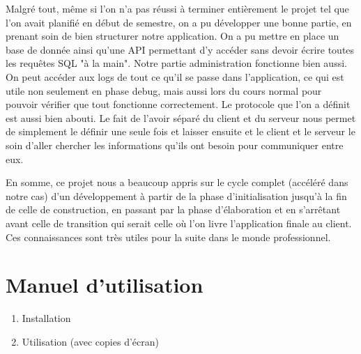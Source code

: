 \documentclass[a4paper,12pt]{article}
\begin{document}
	Malgré tout, même si l'on n'a pas réussi à terminer entièrement le projet tel que l'on avait planifié en début de semestre, on a pu développer une bonne partie, en prenant soin de bien structurer notre application. On a pu mettre en place un base de donnée ainsi qu'une API permettant d'y accéder sans devoir écrire toutes les requêtes SQL "à la main". Notre partie administration fonctionne bien aussi. On peut accéder aux logs de tout ce qu'il se passe dans l'application, ce qui est utile non seulement en phase debug, mais aussi lors du cours normal pour pouvoir vérifier que tout fonctionne correctement. Le protocole que l'on a définit est aussi bien abouti. Le fait de l'avoir séparé du client et du serveur nous permet de simplement le définir une seule fois et laisser ensuite et le client et le serveur le soin d'aller chercher les informations qu'ils ont besoin pour communiquer entre eux.
	
	En somme, ce projet nous a beaucoup appris sur le cycle complet (accéléré dans notre cas) d'un développement à partir de la phase d'initialisation jusqu'à la fin de celle de construction, en passant par la phase d'élaboration et en s'arrêtant avant celle de transition qui serait celle où l'on livre l'application finale au client. Ces connaissances sont très utiles pour la suite dans le monde professionnel.
	
	\appendix
	\section{Manuel d'utilisation} \label{app:manuelUtil}
	\begin{enumerate}
		\item Installation
		\item Utilisation (avec copies d'écran)
	\end{enumerate}
\end{document}
